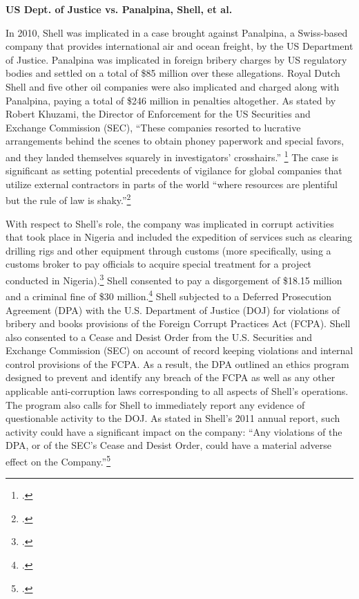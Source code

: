 \textbf{US Dept. of Justice vs. Panalpina, Shell, et al.}



In 2010, Shell was implicated in a case brought against Panalpina, a Swiss-based company that provides international air and ocean freight, by the US Department of Justice. 
Panalpina was implicated in foreign bribery charges by US regulatory bodies and settled on a total of \$85 million over these allegations. 
Royal Dutch Shell and five other oil companies were also implicated and charged along with Panalpina, paying a total of \$246 million in penalties altogether. 
As stated by Robert Khuzami, the Director of Enforcement for the US Securities and Exchange Commission (SEC), ``These companies resorted to lucrative arrangements behind the scenes to obtain phoney paperwork and special favors, and they landed themselves squarely in investigators’ crosshairs.'' \footcite[][p. 119]{KochanGoodYear_2011} 
The case is significant as setting potential precedents of vigilance for global companies that utilize external contractors in parts of the world ``where resources are plentiful but the rule of law is shaky.''\footcite[][]{Bribery_2010}



With respect to Shell's role, the company was implicated in corrupt activities that took place in Nigeria and included the expedition of services such as clearing drilling rigs and other equipment through customs (more specifically, using a customs broker to pay officials to acquire special treatment for a project conducted in Nigeria).\footcite[][]{ShellBribes_2010}
Shell consented to pay a disgorgement of \$18.15 million and a criminal fine of \$30 million.\footcite[][]{SullivanCromwell_2010}
Shell subjected to a Deferred Prosecution Agreement (DPA) with the U.S. Department of Justice (DOJ) for violations of bribery and books provisions of the Foreign Corrupt Practices Act (FCPA). 
Shell also consented to a Cease and Desist Order from the U.S. Securities and Exchange Commission (SEC) on account of record keeping violations and internal control provisions of the FCPA. 
As a result, the DPA outlined an ethics program designed to prevent and identify any breach of the FCPA as well as any other applicable anti-corruption laws corresponding to all aspects of Shell’s operations. 
The program also calls for Shell to immediately report any evidence of questionable activity to the DOJ. 
As stated in Shell's 2011 annual report, such activity could have a significant impact on the company: ``Any violations of the DPA, or of the SEC’s Cease and Desist Order, could have a material adverse effect on the Company.''\footcite[][]{Shell_2011}



